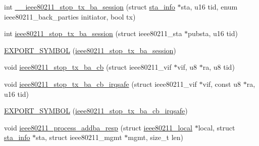 \begin{DoxyCompactItemize}
\item 
int \hyperlink{agg-tx_8c_a515f5c1cee515484ce3b26ae657b8873}{\-\_\-\-\_\-ieee80211\-\_\-stop\-\_\-tx\-\_\-ba\-\_\-session} (struct \hyperlink{structsta__info}{sta\-\_\-info} $\ast$sta, u16 tid, enum ieee80211\-\_\-back\-\_\-parties initiator, bool tx)
\item 
int \hyperlink{agg-tx_8c_afe61732813b7482c321ed267c69f8b44}{ieee80211\-\_\-stop\-\_\-tx\-\_\-ba\-\_\-session} (struct ieee80211\-\_\-sta $\ast$pubsta, u16 tid)
\item 
\hyperlink{agg-tx_8c_af2bce836b1761826862da998e220782c}{E\-X\-P\-O\-R\-T\-\_\-\-S\-Y\-M\-B\-O\-L} (\hyperlink{agg-tx_8c_afe61732813b7482c321ed267c69f8b44}{ieee80211\-\_\-stop\-\_\-tx\-\_\-ba\-\_\-session})
\item 
void \hyperlink{agg-tx_8c_a863731e7ca24b91601e4ef0fa7776a60}{ieee80211\-\_\-stop\-\_\-tx\-\_\-ba\-\_\-cb} (struct ieee80211\-\_\-vif $\ast$vif, u8 $\ast$ra, u8 tid)
\item 
void \hyperlink{agg-tx_8c_a5329260e3dcb4a6595bcd8ac3f1a5b16}{ieee80211\-\_\-stop\-\_\-tx\-\_\-ba\-\_\-cb\-\_\-irqsafe} (struct ieee80211\-\_\-vif $\ast$vif, const u8 $\ast$ra, u16 tid)
\item 
\hyperlink{agg-tx_8c_a509da822e336fca2eafc9ad3dd4a7d7d}{E\-X\-P\-O\-R\-T\-\_\-\-S\-Y\-M\-B\-O\-L} (\hyperlink{agg-tx_8c_a5329260e3dcb4a6595bcd8ac3f1a5b16}{ieee80211\-\_\-stop\-\_\-tx\-\_\-ba\-\_\-cb\-\_\-irqsafe})
\item 
void \hyperlink{agg-tx_8c_a186f5f6a44f76c9723f750fd640f3d66}{ieee80211\-\_\-process\-\_\-addba\-\_\-resp} (struct \hyperlink{structieee80211__local}{ieee80211\-\_\-local} $\ast$local, struct \hyperlink{structsta__info}{sta\-\_\-info} $\ast$sta, struct ieee80211\-\_\-mgmt $\ast$mgmt, size\-\_\-t len)
\end{DoxyCompactItemize}


